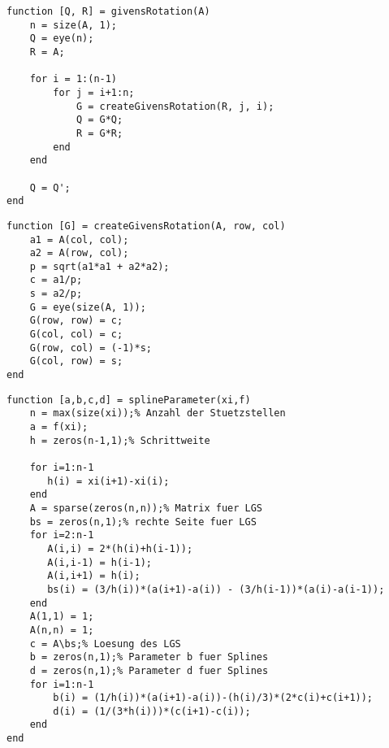 \documentclass[german]{latex4ei/latex4ei_sheet}
\begin{document}
\begin{lstlisting}
function [Q, R] = givensRotation(A)
    n = size(A, 1);
    Q = eye(n);
    R = A;

    for i = 1:(n-1)
        for j = i+1:n;
            G = createGivensRotation(R, j, i);
            Q = G*Q;
            R = G*R;
        end
    end

    Q = Q';
end
\end{lstlisting}

\begin{lstlisting}
function [G] = createGivensRotation(A, row, col)
    a1 = A(col, col);
    a2 = A(row, col);
    p = sqrt(a1*a1 + a2*a2);
    c = a1/p;
    s = a2/p;
    G = eye(size(A, 1));
    G(row, row) = c;
    G(col, col) = c;
    G(row, col) = (-1)*s;
    G(col, row) = s;
end
\end{lstlisting}

\begin{lstlisting}
function [a,b,c,d] = splineParameter(xi,f)
	n = max(size(xi));% Anzahl der Stuetzstellen
	a = f(xi);
    h = zeros(n-1,1);% Schrittweite

    for i=1:n-1
       h(i) = xi(i+1)-xi(i);
    end
    A = sparse(zeros(n,n));% Matrix fuer LGS
    bs = zeros(n,1);% rechte Seite fuer LGS
    for i=2:n-1
       A(i,i) = 2*(h(i)+h(i-1));
       A(i,i-1) = h(i-1);
       A(i,i+1) = h(i);
       bs(i) = (3/h(i))*(a(i+1)-a(i)) - (3/h(i-1))*(a(i)-a(i-1));
    end
    A(1,1) = 1;
    A(n,n) = 1;
    c = A\bs;% Loesung des LGS
    b = zeros(n,1);% Parameter b fuer Splines
    d = zeros(n,1);% Parameter d fuer Splines
    for i=1:n-1
        b(i) = (1/h(i))*(a(i+1)-a(i))-(h(i)/3)*(2*c(i)+c(i+1));
        d(i) = (1/(3*h(i)))*(c(i+1)-c(i));
    end
end
\end{lstlisting}
\end{document}
